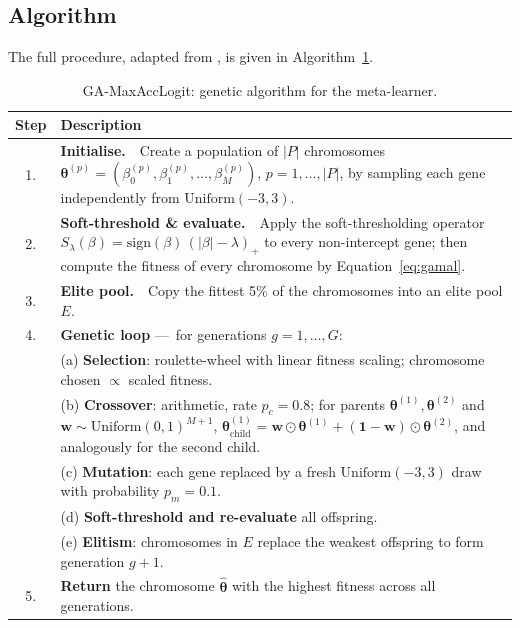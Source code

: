 \subsection{Algorithm}

The full procedure, adapted from \citet{stripling2018proflogit},
is given in Algorithm~\ref{alg:gamal}.

\begin{table}[H]
\centering
\caption{GA-MaxAccLogit: genetic algorithm for the meta-learner.}
\singlespacing
\label{alg:gamal}
\small
\begin{tabular}{@{}c p{}@{}}
\toprule
\textbf{Step} & \textbf{Description}\\
\midrule
1. & \textbf{Initialise.}\ \ Create a population of $|P|$ chromosomes
$\boldsymbol{\theta}^{(p)}=(\beta_0^{(p)},\beta_1^{(p)},\ldots,\beta_M^{(p)})$,
$p=1,\ldots,|P|$, by sampling each gene independently from
$\mathrm{Uniform}(-3,3)$.\\[2mm]

2. & \textbf{Soft-threshold \& evaluate.}\ \ Apply the soft-thresholding
operator $S_\lambda(\beta)=\mathrm{sign}(\beta)\,(|\beta|-\lambda)_{+}$
to every non-intercept gene; then compute the fitness of every
chromosome by Equation~\eqref{eq:gamal}.\\[2mm]

3. & \textbf{Elite pool.}\ \ Copy the fittest 5\% of the chromosomes
into an elite pool $E$.\\[2mm]

4. & \textbf{Genetic loop} ---\ for generations $g=1,\ldots,G$:
\\[1mm]
 & \quad (a) \textbf{Selection}: roulette-wheel with linear fitness
 scaling; chromosome chosen $\propto$ scaled fitness.\\[1mm]
 & \quad (b) \textbf{Crossover}: arithmetic, rate $p_c=0.8$; for
 parents $\boldsymbol{\theta}^{(1)},\boldsymbol{\theta}^{(2)}$ and
 $\mathbf{w}\sim\mathrm{Uniform}(0,1)^{M+1}$,
 \(\boldsymbol{\theta}^{(1)}_{\text{child}}=
 \mathbf{w}\odot\boldsymbol{\theta}^{(1)}
 +(\mathbf{1}-\mathbf{w})\odot\boldsymbol{\theta}^{(2)}\),
 and analogously for the second child.\\[1mm]
 & \quad (c) \textbf{Mutation}: each gene replaced by a fresh
 $\mathrm{Uniform}(-3,3)$ draw with probability $p_m=0.1$.\\[1mm]
 & \quad (d) \textbf{Soft-threshold and re-evaluate} all offspring.\\[1mm]
 & \quad (e) \textbf{Elitism}: chromosomes in $E$ replace the
 weakest offspring to form generation $g+1$.\\[2mm]

5. & \textbf{Return} the chromosome $\hat{\boldsymbol{\theta}}$ with
the highest fitness across all generations.\\
\bottomrule
\end{tabular}
\end{table}
